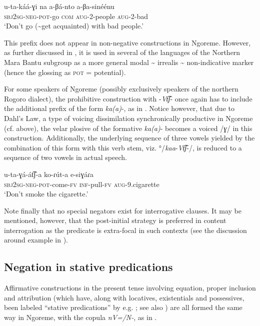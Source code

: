 \documentclass[output=paper,colorlinks,citecolor=brown,draftmode]{langscibook}
\begin{document}
\ea\label{ex:ngo:26} 
    \gll u-ta-káá{}-ɣi na a{}-βá-nto a{}-βa-sinéénu \\ 
        \textsc{sbj2sg}-\textsc{neg}{}-\textsc{pot}{}-go \textsc{com} \textsc{aug}{}-2-people \textsc{aug-}2-bad\\
    \glt ‘Don’t go ({\textasciitilde}get acquainted) with bad people.’ 
\z 

This prefix does not appear in non-negative constructions in Ngoreme. However, as further discussed in , it is used in several of the languages of the Northern Mara Bantu subgroup as a more general modal {\textasciitilde} irrealis {\textasciitilde} non-indicative marker (hence the glossing as \textsc{pot} = potential).

 For some speakers of Ngoreme (possibly exclusively speakers of the northern Rogoro dialect), the prohibitive construction with -\textit{Vt͡ʃ}\nobreakdash- once again has to include the additional prefix of the form \textit{ka(a)}{}-, as in . Notice however, that due to Dahl’s Law, a type of voicing dissimilation synchronically productive in Ngoreme (cf.  above), the velar plosive of the formative \textit{ka(a)}\nobreakdash- becomes a voiced /\textit{ɣ}/ in this construction. Additionally, the underlying sequence of three vowels yielded by the combination of this form with this verb stem, viz. °/\textit{kaa}{}-\textit{Vt͡ʃ}{}-/, is reduced to a sequence of two vowels in actual speech.

\ea\label{ex:ngo:27} 
    \gll u-ta-ɣá-át͡ʃ-a ko-ɾút-a e-siɣáɾa\\ 
        \textsc{sbj}2\textsc{sg}{}-\textsc{neg}{}-\textsc{pot}{}-come-\textsc{fv} \textsc{inf}{}-pull-\textsc{fv} \textsc{aug}{}-9.cigarette\\
    \glt ‘Don’t smoke the cigarette.’
\z 

Note finally that no special negators exist for interrogative clauses. It may be mentioned, however, that the post-initial strategy is preferred in content interrogation as the predicate is extra-focal in such contexts (see the discussion around example  in ).

\subsection{Negation in stative predications}\label{sec:ngo:2.3}

Affirmative constructions in the present tense involving equation, proper inclusion and attribution (which have, along with locatives, existentials and possessives, been labeled “stative predications” by e.g. \citealt[111ff]{Payne1997}; see also \citealt{Veselinova2014}) are all formed the same way in Ngoreme, with the copula \textit{nV=/N-}, as in .
\end{document}
